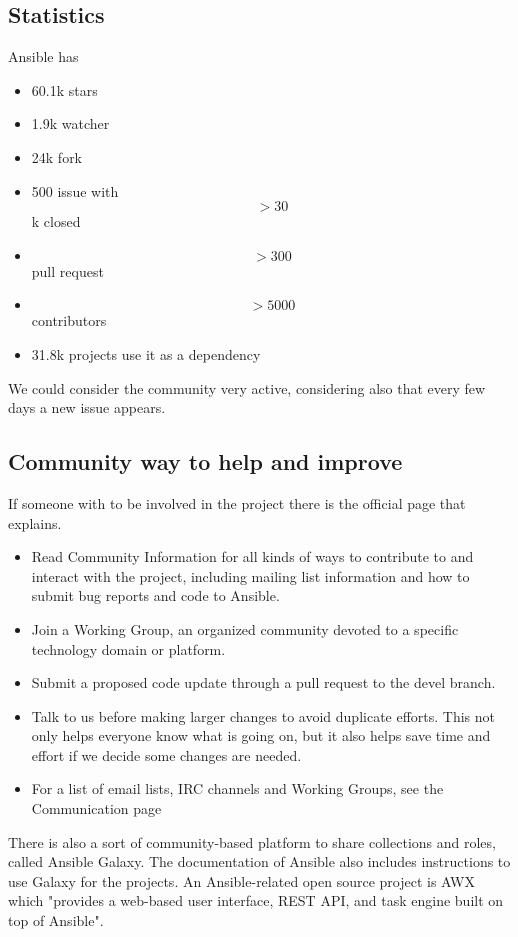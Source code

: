 \documentclass[12pt,a4paper,openright,twoside]{book}
\begin{document}
\subsection{Statistics}
Ansible has 
\begin{itemize}
    \item 60.1k stars
    \item 1.9k watcher
    \item 24k fork
    \item 500 issue with \[>30\]k closed
    \item \[>300\] pull request
    \item \[>5000\] contributors
    \item 31.8k projects use it as a dependency
\end{itemize}

We could consider the community very active, considering also that every few days a new issue appears.

\subsection{Community way to help and improve}
If someone with to be involved in the project there is the official page that explains\cite {ansibleGithub}.

\begin{itemize}
    \item Read Community Information for all kinds of ways to contribute to and interact with the project, including mailing list information and how to submit bug reports and code to Ansible.
    \item Join a Working Group, an organized community devoted to a specific technology domain or platform.
    \item Submit a proposed code update through a pull request to the devel branch.
    \item Talk to us before making larger changes to avoid duplicate efforts. This not only helps everyone know what is going on, but it also helps save time and effort if we decide some changes are needed.
    \item For a list of email lists, IRC channels and Working Groups, see the Communication page
\end{itemize}

There is also a sort of community-based platform to share collections and roles, called Ansible Galaxy\cite{ansibleGalaxy}.
The documentation of Ansible also includes instructions to use Galaxy for the projects.
An Ansible-related open source project is AWX which "provides a web-based user interface, REST API, and task engine built on top of Ansible"\cite{ansibleAWX}.
\end{document}
